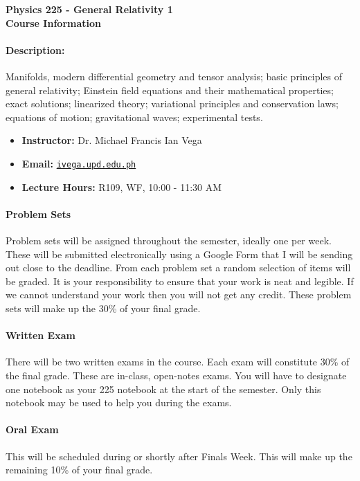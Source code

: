 \begin{center}
	{
		\Large
		\textbf{Physics 225 - General Relativity 1\\[10pt] Course Information}
	}    
\end{center}

	\paragraph{Description: } 
	Manifolds, modern differential geometry and tensor analysis; basic principles of general relativity;
	Einstein field equations and their mathematical properties; exact solutions; linearized theory; variational
	principles and conservation laws; equations of motion; gravitational waves; experimental tests.

	\begin{itemize}[]
		\item[] \textbf{Instructor: } Dr. Michael Francis Ian Vega
		\item[] \textbf{Email: } {\texttt{\url{ivega.upd.edu.ph}}}
		\item[] \textbf{Lecture Hours: } R109, WF, 10:00 - 11:30 AM
	\end{itemize}

	\paragraph{Problem Sets} 

	Problem sets will be assigned throughout the semester, ideally one per week. These will be
	submitted electronically using a Google Form that I will be sending out close to the deadline. From each
	problem set a random selection of items will be graded. It is your responsibility to ensure that your work
	is neat and legible. If we cannot understand your work then you will not get any credit. These problem
	sets will make up the 30\% of your final grade.

	\paragraph{Written Exam} 
	There will be two written exams in the course. Each exam will constitute 30\% of the final grade.
	These are in-class, open-notes exams. You will have to designate one notebook as your 225
	notebook at the start of the semester. Only this notebook may be used to help you during the exams.

	\paragraph{Oral Exam} This will be scheduled during or shortly after Finals Week. This will make up the remaining 10\%
	of your final grade.


